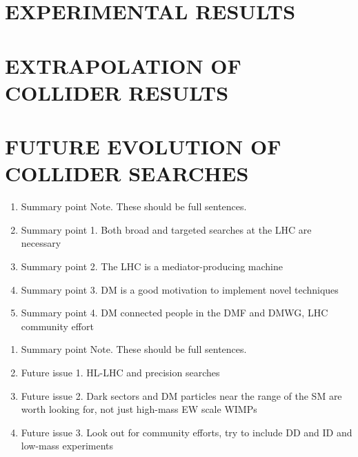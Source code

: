 \documentclass{ar-1col}
\begin{document}


\section{EXPERIMENTAL RESULTS}



\section{EXTRAPOLATION OF COLLIDER RESULTS}

\section{FUTURE EVOLUTION OF COLLIDER SEARCHES}
\label{sec:05_Future}

\clearpage


\begin{summary}
\begin{enumerate}
\item Summary point Note. These should be full sentences.
\item Summary point 1. Both broad and targeted searches at the LHC are necessary
\item Summary point 2. The LHC is a mediator-producing machine
\item Summary point 3. DM is a good motivation to implement novel techniques 
\item Summary point 4. DM connected people in the DMF and DMWG, LHC community effort 
\end{enumerate}
\end{summary}

\begin{issues}
\begin{enumerate}
\item Summary point Note. These should be full sentences.
\item Future issue 1. HL-LHC and precision searches
\item Future issue 2. Dark sectors and DM particles near the range of the SM are worth looking for, not just high-mass EW scale WIMPs
\item Future issue 3. Look out for community efforts, try to include DD and ID and low-mass experiments 
\end{enumerate}
\end{issues}
\end{document}
